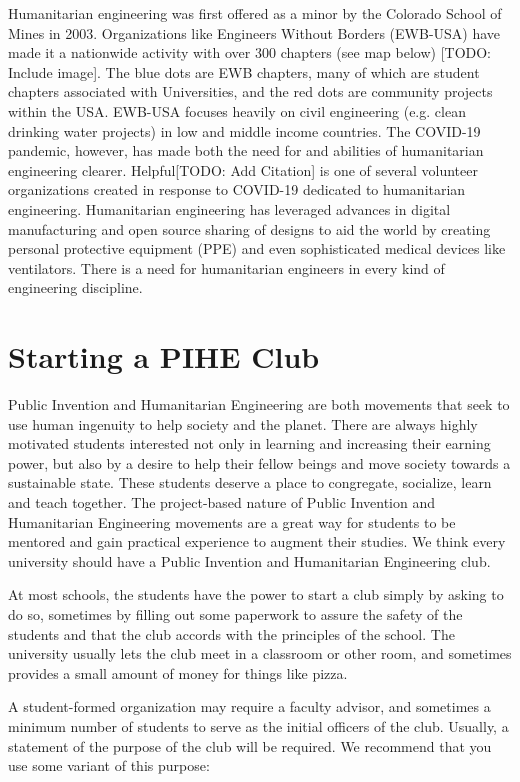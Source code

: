 \documentclass[
	fontsize=10pt, %
	twoside=false, %
	secnumdepth=1, %
]{kaobook}
\begin{document}
Humanitarian engineering was first offered as a minor by the Colorado
School of Mines in 2003. Organizations like Engineers Without Borders
(EWB-USA) have made it a nationwide activity with over 300 chapters
(see map below) [TODO: Include image]. The blue dots are EWB chapters, many
of which are student chapters associated with Universities, and the
red dots are community projects within the USA. EWB-USA focuses
heavily on civil engineering (e.g. clean drinking water projects) in
low and middle income countries. The COVID-19 pandemic, however, has
made both the need for and abilities of humanitarian engineering
clearer. Helpful[TODO: Add Citation] is one of several volunteer organizations created in
response to COVID-19 dedicated to humanitarian
engineering. Humanitarian engineering has leveraged advances in
digital manufacturing and open source sharing of designs to aid the
world by creating personal protective equipment (PPE) and even
sophisticated medical devices like ventilators. There is a need for
humanitarian engineers in every kind of engineering discipline.

\section{Starting a PIHE Club}

Public Invention and Humanitarian Engineering are both movements that
seek to use human ingenuity to help society and the planet. There are
always highly motivated students interested not only in learning and
increasing their earning power, but also by a desire to help their
fellow beings and move society towards a sustainable state. These
students deserve a place to congregate, socialize, learn and teach
together. The project-based nature of Public Invention and
Humanitarian Engineering movements are a great way for students to be
mentored and gain practical experience to augment their studies. We
think every university should have a Public Invention and Humanitarian
Engineering club.

At most schools, the students have the power to start a club simply by
asking to do so, sometimes by filling out some paperwork to assure the
safety of the students and that the club accords with the principles
of the school. The university usually lets the club meet in a
classroom or other room, and sometimes provides a small amount of
money for things like pizza.

A student-formed organization may require a faculty advisor, and
sometimes a minimum number of students to serve as the initial
officers of the club. Usually, a statement of the purpose of the club
will be required. We recommend that you use some variant of this
purpose:
\end{document}
